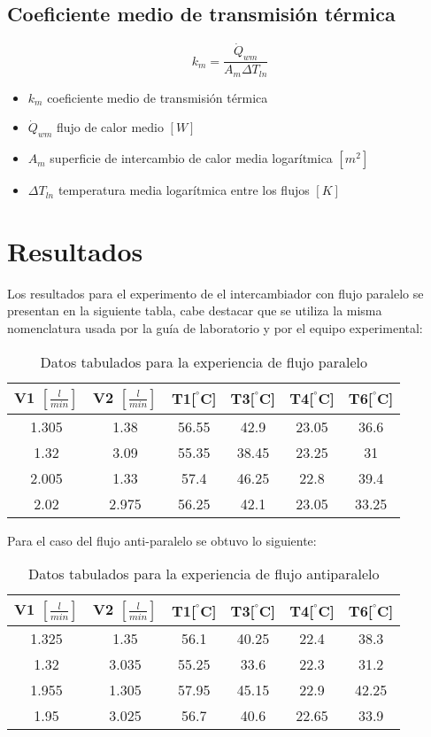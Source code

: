\documentclass[letterpaper,11pt]{article} %
\begin{document}
\subsection{Coeficiente medio de transmisión térmica}
\begin{equation}
k_m = \frac{\dot{Q}_{wm}}{A_m \Delta T_{ln}}
\end{equation}
\begin{itemize}
	\item $k_m$ coeficiente medio de transmisión térmica
	\item $\dot{Q}_{wm}$ flujo de calor medio $[W]$
	\item $A_m$ superficie de intercambio de calor media logarítmica $[m^2]$
	\item $\Delta T_{ln}$ temperatura media logarítmica entre los flujos $[K]$
	
\end{itemize}
\newpage
\section{Resultados}
Los resultados para el experimento de el intercambiador con flujo paralelo se presentan en la siguiente tabla, cabe destacar que se utiliza la misma nomenclatura usada por la guía de laboratorio y por el equipo experimental:
\newp
\begin{table}[htbp]
    \centering
    
    \caption{Datos tabulados para la experiencia de flujo paralelo}
    \begin{tabular}{c|c|c|c|c|c}
    V1 $[\frac{l}{min}]$ & V2 $[\frac{l}{min}]$ &T1[$^{°}$C]& T3[$^{°}$C]&T4[$^{°}$C]&T6[$^{°}$C]\\
        \hline
        1.305 & 1.38 & 56.55 &42.9 &23.05 &36.6\\
        1.32 & 3.09 & 55.35 &38.45 &23.25 &31\\
        2.005 & 1.33 & 57.4 &46.25 &22.8 &39.4\\
        2.02 & 2.975 & 56.25 &42.1 &23.05 &33.25\\
    \end{tabular}
    \label{tab:paralelo}
\end{table}
\newp
Para el caso del flujo anti-paralelo se obtuvo lo siguiente:
\begin{table}[htbp]
    \centering
    \caption{Datos tabulados para la experiencia de flujo antiparalelo}
    \begin{tabular}{c|c|c|c|c|c}
    
        V1 $[\frac{l}{min}]$ & V2 $[\frac{l}{min}]$ &T1[$^{°}$C]& T3[$^{°}$C]&T4[$^{°}$C]&T6[$^{°}$C]\\
        \hline
        1.325 & 1.35 & 56.1 &40.25 &22.4 &38.3\\
        1.32 & 3.035 & 55.25 &33.6 &22.3 &31.2\\
        1.955 & 1.305 & 57.95 &45.15 &22.9 &42.25\\
        1.95 & 3.025 & 56.7 &40.6 &22.65 &33.9\\
    \end{tabular}
    \label{tab:antiparalelo}
\end{table}
\end{document}
